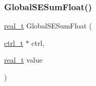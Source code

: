 \mbox{\label{a00344_a6cd212bae78535674c941b90373d6b0b}} 
\subsubsection{\texorpdfstring{Global\+S\+E\+Sum\+Float()}{GlobalSESumFloat()}}
{\footnotesize\ttfamily \hyperlink{a00876_a1924a4f6907cc3833213aba1f07fcbe9}{real\+\_\+t} Global\+S\+E\+Sum\+Float (\begin{DoxyParamCaption}\item[{\hyperlink{a00742}{ctrl\+\_\+t} $\ast$}]{ctrl,  }\item[{\hyperlink{a00876_a1924a4f6907cc3833213aba1f07fcbe9}{real\+\_\+t}}]{value }\end{DoxyParamCaption})}

